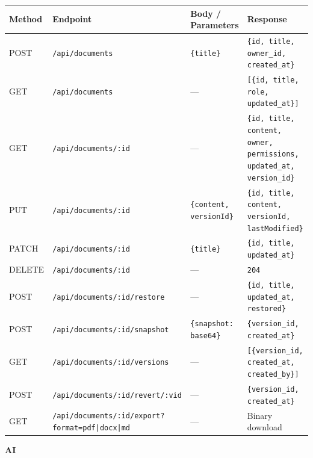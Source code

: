 \documentclass{article}
\begin{document}
\noindent
{\small
\begin{tabularx}{\textwidth}{|>{\hsize=0.3\hsize\raggedright\arraybackslash}X|>{\hsize=0.85\hsize\raggedright\arraybackslash}X|>{\hsize=0.4\hsize\raggedright\arraybackslash}X|>{\hsize=0.45\hsize\raggedright\arraybackslash}X|}
    \hline
    \rowcolor{tableBlue}
    \textbf{\color{white}Method} &
    \textbf{\color{white}Endpoint} &
    \textbf{\color{white}Body / Parameters} &
    \textbf{\color{white}Response} \\
    \hline
    POST & \texttt{/api/documents} & \texttt{\{title\}} & \texttt{\{id, title, owner\_id, created\_at\}} \\
    \hline
    GET & \texttt{/api/documents} & — & \texttt{[\{id, title, role, updated\_at\}]} \\
    \hline
    GET & \texttt{/api/documents/:id} & — & \texttt{\{id, title, content, owner, permissions, updated\_at, version\_id\}} \\
    \hline
    PUT & \texttt{/api/documents/:id} & \texttt{\{content, versionId\}} & \texttt{\{id, title, content, versionId, lastModified\}} \\
    \hline
    PATCH & \texttt{/api/documents/:id} & \texttt{\{title\}} & \texttt{\{id, title, updated\_at\}} \\
    \hline
    DELETE & \texttt{/api/documents/:id} & — & \texttt{204} \\
    \hline
    POST & \texttt{/api/documents/:id/restore} & — & \texttt{\{id, title, updated\_at, restored\}} \\
    \hline
    POST & \texttt{/api/documents/:id/snapshot} & \texttt{\{snapshot: base64\}} & \texttt{\{version\_id, created\_at\}} \\
    \hline
    GET & \texttt{/api/documents/:id/versions} & — & \texttt{[\{version\_id, created\_at, created\_by\}]} \\
    \hline
    POST & \texttt{/api/documents/:id/revert/:vid} & — & \texttt{\{version\_id, created\_at\}} \\
    \hline
    GET & \texttt{/api/documents/:id/export?format=pdf|docx|md} & — & Binary download \\
    \hline
\end{tabularx}
}

\vspace{10pt}
\noindent\textbf{AI}
\vspace{5pt}
\end{document}
